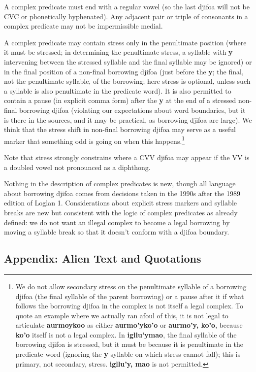 \documentclass[12pt]{book}
\begin{document}
A complex predicate must end with a regular vowel (so the last djifoa will not be CVC or phonetically hyphenated).  Any adjacent pair or triple of consonants in a complex predicate may not be
impermissible medial.

A complex predicate may contain stress only in the penultimate position (where it must be stressed; in determining the penultimate stress, a syllable with {\bf y} intervening between the stressed syllable and the final syllable may be ignored) or in the final position of a non-final borrowing djifoa (just before the {\bf y}; the final, not the penultimate syllable, of the borrowing; here stress is optional, unless such a syllable is also penultimate in the predicate word).  It is also permitted to contain a pause 
(in explicit comma form) after the {\bf y} at the end of  a stressed non-final borrowing djifoa (violating our expectations about word boundaries, but it is there in the sources, and it may be practical, as borrowing djifoa are large).   We think that the stress shift in non-final borrowing djifoa may serve as a useful marker that something odd is going on when this happens.\footnote{We do not allow secondary stress on the penultimate syllable of a borrowing djifoa (the final syllable of the parent borrowing) or a pause after it if what follows the borrowing djifoa in the complex is not itself a legal complex.  To quote an example where we actually ran afoul of this, it is not legal to articulate {\bf aurmoykoo} as either {\bf aurmo'yko'o} or {\bf aurmo'y, ko'o}, because {\bf ko'o} itself is not a legal complex.  In {\bf igllu'ymao}, the final syllable of the borrowing djifoa is stressed, but it must be because it is penultimate in the predicate word
(ignoring the {\bf y} syllable on which stress cannot fall); this is primary, not secondary, stress.  {\bf igllu'y, mao} is not permitted.}

Note that stress strongly constrains where a CVV djifoa may appear if the VV is a doubled vowel not pronounced as a diphthong.

Nothing in the description of complex predicates is new, though all language about borrowing djifoa comes from decisions taken in the 1990s after the 1989 edition of Loglan 1.  Considerations about explicit stress markers and syllable breaks are new but consistent with the logic of complex predicates as already defined:  we do not want an illegal complex to become a legal borrowing by moving a syllable break so that it doesn't conform with a djifoa boundary.  

\subsection{Appendix:  Alien Text and Quotations}
\end{document}
